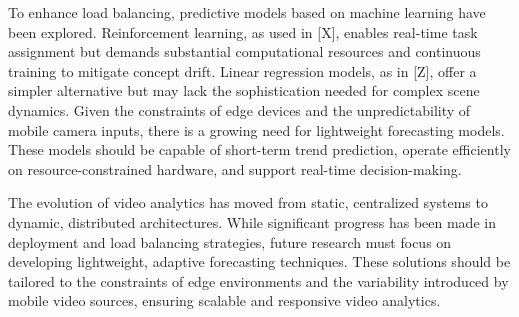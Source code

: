 To enhance load balancing, predictive models based on machine learning have been explored. Reinforcement learning, as used in [X], enables real-time task assignment but demands substantial computational resources and continuous training to mitigate concept drift. Linear regression models, as in [Z], offer a simpler alternative but may lack the sophistication needed for complex scene dynamics.
Given the constraints of edge devices and the unpredictability of mobile camera inputs, there is a growing need for lightweight forecasting models. These models should be capable of short-term trend prediction, operate efficiently on resource-constrained hardware, and support real-time decision-making.


The evolution of video analytics has moved from static, centralized systems to dynamic, distributed architectures. While significant progress has been made in deployment and load balancing strategies, future research must focus on developing lightweight, adaptive forecasting techniques. These solutions should be tailored to the constraints of edge environments and the variability introduced by mobile video sources, ensuring scalable and responsive video analytics.




